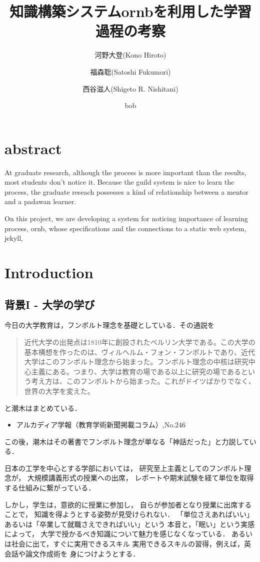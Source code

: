 \documentclass[a4,p11]{article}
\author[1]{河野大登(Kono Hiroto)}
\author[1]{福森聡(Satoshi Fukumori)}
\author[1]{西谷滋人(Shigeto R. Nishitani)}
\affil[1]{関西学院大学理工学部情報科学科(三田市)．Department of Informatics, Kwansei Gakuin University(Sanda-shi, Hyogo).}
\author{bob}
\date{}
\title{知識構築システムornbを利用した学習過程の考察}
\begin{document}
\maketitle

\section{abstract}
\label{sec:org6e2d32a}
At graduate research, 
although the process is more important than the results,
most students don't notice it.
Because the guild system is nice to learn the process,
the graduate reseach possesses a kind of
relationship between 
a mentor and a padawan learner.

On this project, 
we are developing a system for
noticing importance of learning process,
ornb, whose specifications and 
the connections to a static web system, jekyll,

\section{Introduction}
\label{sec:org37302ac}
\subsection{背景I - 大学の学び}
\label{sec:org2b70801}
今日の大学教育は，フンボルト理念を基礎としている．その通説を
\begin{quote}
近代大学の出発点は1810年に創設されたベルリン大学である。この大学の基本構想を作ったのは、ヴィルヘルム・フォン・フンボルトであり、近代大学はこのフンボルト理念から始まった。フンボルト理念の中核は研究中心主義にある。つまり、大学は教育の場である以上に研究の場であるという考え方は、このフンボルトから始まった。これがドイツばかりでなく、世界の大学を変えた。
\end{quote}
と潮木はまとめている．
\begin{itemize}
\item アルカディア学報（教育学術新聞掲載コラム）,No.246
\end{itemize}
この後，潮木はその著書でフンボルト理念が単なる「神話だった」と力説している．

日本の工学を中心とする学部においては，
研究至上主義としてのフンボルト理念が，
大規模講義形式の授業への出席，
レポートや期末試験を経て単位を取得する仕組みに繋がっている．

しかし，学生は，意欲的に授業に参加し，
自らが参加者となり授業に出席することで，
知識を得ようとする姿勢が見受けられない．
「単位さえあればいい」あるいは「卒業して就職さえできればいい」という
本音と，「眠い」という実感によって，
大学で授かるべき知識について魅力を感じなくなっている．
あるいは社会に出て，すぐに実用できるスキル
実用できるスキルの習得，例えば，英会話や論文作成術を
身につけようとする．
\end{document}
